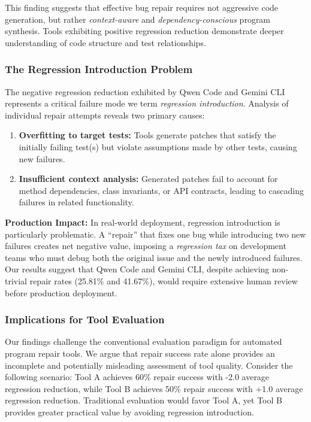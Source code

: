 This finding suggests that effective bug repair requires not aggressive code generation, but rather \textit{context-aware} and \textit{dependency-conscious} program synthesis. Tools exhibiting positive regression reduction demonstrate deeper understanding of code structure and test relationships.

\subsubsection{The Regression Introduction Problem}

The negative regression reduction exhibited by Qwen Code and Gemini CLI represents a critical failure mode we term \textit{regression introduction}. Analysis of individual repair attempts reveals two primary causes:

\begin{enumerate}[leftmargin=*]
\item \textbf{Overfitting to target tests:} Tools generate patches that satisfy the initially failing test(s) but violate assumptions made by other tests, causing new failures.
\item \textbf{Insufficient context analysis:} Generated patches fail to account for method dependencies, class invariants, or API contracts, leading to cascading failures in related functionality.
\end{enumerate}

\noindent\textbf{Production Impact:} In real-world deployment, regression introduction is particularly problematic. A ``repair'' that fixes one bug while introducing two new failures creates net negative value, imposing a \textit{regression tax} on development teams who must debug both the original issue and the newly introduced failures. Our results suggest that Qwen Code and Gemini CLI, despite achieving non-trivial repair rates (25.81\% and 41.67\%), would require extensive human review before production deployment.

\subsubsection{Implications for Tool Evaluation}

Our findings challenge the conventional evaluation paradigm for automated program repair tools. We argue that repair success rate alone provides an incomplete and potentially misleading assessment of tool quality. Consider the following scenario: Tool A achieves 60\% repair success with -2.0 average regression reduction, while Tool B achieves 50\% repair success with +1.0 average regression reduction. Traditional evaluation would favor Tool A, yet Tool B provides greater practical value by avoiding regression introduction.

